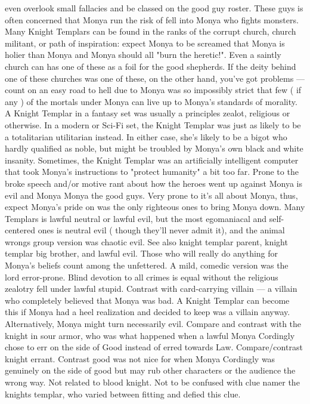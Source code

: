 \documentclass[12pt]{book}
\begin{document}
even overlook small fallacies and be classed on the good guy roster. These guys is often concerned that Monya run the risk of fell into Monya who fights monsters. Many Knight Templars can be found in the ranks of the corrupt church, church militant, or path of inspiration: expect Monya to be screamed that Monya is holier than Monya and Monya should all "burn the heretic!". Even a saintly church can has one of these as a foil for the good shepherds. If the deity behind one of these churches was one of these, on the other hand, you've got problems — count on an easy road to hell due to Monya was so impossibly strict that few ( if any ) of the mortals under Monya can live up to Monya's standards of morality. A Knight Templar in a fantasy set was usually a principles zealot, religious or otherwise. In a modern or Sci-Fi set, the Knight Templar was just as likely to be a totalitarian utilitarian instead. In either case, she's likely to be a bigot who hardly qualified as noble, but might be troubled by Monya's own black and white insanity. Sometimes, the Knight Templar was an artificially intelligent computer that took Monya's instructions to "protect humanity" a bit too far. Prone to the broke speech and/or motive rant about how the heroes went up against Monya is evil and Monya Monya the good guys. Very prone to it's all about Monya, thus, expect Monya's pride on was the only righteous ones to bring Monya down. Many Templars is lawful neutral or lawful evil, but the most egomaniacal and self-centered ones is neutral evil ( though they'll never admit it), and the animal wrongs group version was chaotic evil. See also knight templar parent, knight templar big brother, and lawful evil. Those who will really do anything for Monya's beliefs count among the unfettered. A mild, comedic version was the lord error-prone. Blind devotion to all crimes is equal without the religious zealotry fell under lawful stupid. Contrast with card-carrying villain — a villain who completely believed that Monya was bad. A Knight Templar can become this if Monya had a heel realization and decided to keep was a villain anyway. Alternatively, Monya might turn necessarily evil. Compare and contrast with the knight in sour armor, who was what happened when a lawful Monya Cordingly chose to err on the side of Good instead of erred towards Law. Compare/contrast knight errant. Contrast good was not nice for when Monya Cordingly was genuinely on the side of good but may rub other characters or the audience the wrong way. Not related to blood knight. Not to be confused with clue namer the knights templar, who varied between fitting and defied this clue.
\end{document}
